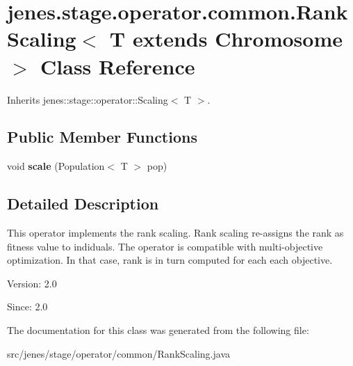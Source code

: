 \hypertarget{classjenes_1_1stage_1_1operator_1_1common_1_1_rank_scaling_3_01_t_01extends_01_chromosome_01_4}{
\section{jenes.stage.operator.common.RankScaling$<$ T extends Chromosome $>$ Class Reference}
\label{classjenes_1_1stage_1_1operator_1_1common_1_1_rank_scaling_3_01_t_01extends_01_chromosome_01_4}
}
Inherits jenes::stage::operator::Scaling$<$ T $>$.

\subsection*{Public Member Functions}
\begin{CompactItemize}
\item 
\hypertarget{classjenes_1_1stage_1_1operator_1_1common_1_1_rank_scaling_3_01_t_01extends_01_chromosome_01_4_8158f18c672b8764a11ba70a52514132}{
void \textbf{scale} (Population$<$ T $>$ pop)}
\label{classjenes_1_1stage_1_1operator_1_1common_1_1_rank_scaling_3_01_t_01extends_01_chromosome_01_4_8158f18c672b8764a11ba70a52514132}

\end{CompactItemize}


\subsection{Detailed Description}
This operator implements the rank scaling. Rank scaling re-assigns the rank as fitness value to indiduals. The operator is compatible with multi-objective optimization. In that case, rank is in turn computed for each each objective.

\begin{Desc}
\item[Version:]2.0 \end{Desc}
\begin{Desc}
\item[Since:]2.0 \end{Desc}


The documentation for this class was generated from the following file:\begin{CompactItemize}
\item 
src/jenes/stage/operator/common/RankScaling.java\end{CompactItemize}
